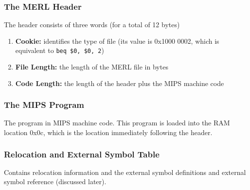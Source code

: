 \documentclass{report}
\begin{document}
\subsubsection{The MERL Header}
The header consists of three words (for a total of 12 bytes)
\begin{enumerate}
\item \textbf{Cookie:} identifies the type of file (its value is 0x1000 0002, which is equivalent to \texttt{beq \$0, \$0, 2})
\item \textbf{File Length:} the length of the MERL file in bytes
\item \textbf{Code Length:} the length of the header plus the MIPS machine code
\end{enumerate}
\subsubsection{The MIPS Program}
The program in MIPS machine code. This program is loaded into the RAM location 0x0c, which is the location immediately following the header.
\subsubsection{Relocation and External Symbol Table}
Contains relocation information and the external symbol definitions and external symbol reference (discussed later).
\end{document}
